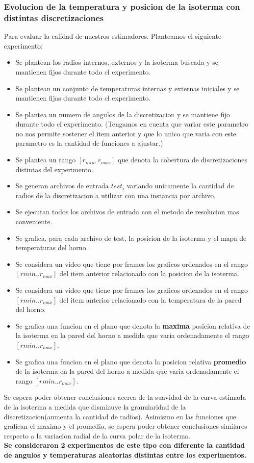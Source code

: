 \subsubsection{Evolucion de la temperatura y posicion de la isoterma con distintas discretizaciones}
Para evaluar la calidad de nuestros estimadores. Planteamos el siguiente experimento:
\begin{itemize}
    \item Se plantean los radios internos, externos y la isoterma buscada y se mantienen fijos durante todo el experimento.
    \item Se plantean un conjunto de temperaturas internas y externas iniciales y se mantienen fijas durante todo el experimento.
    \item Se plantea un numero de angulos de la discretizacion y se mantiene fijo durante todo el experimento. (Tengamos en cuenta que variar este parametro no nos permite sostener el item anterior y que lo unico que varia con este parametro es la cantidad de funciones a ajustar.) 
    \item Se plantea un rango $[r_{min}, r_{max}]$ que denota la cobertura de discretizaciones distintas del experimento.
    \item Se generan archivos de entrada $test_i$ variando unicamente la cantidad de radios de la discretizacion a utilizar con una instancia por archivo.
    \item Se ejecutan todos los archivos de entrada con el metodo de resolucion mas conveniente.
    \item Se grafica, para cada archivo de test, la posicion de la isoterma y el mapa de temperaturas del horno.
    \item Se considera un video que tiene por frames los graficos ordenados en el rango $[r{min}..r_{max}]$ del item anterior relacionado con la posicion de la isoterma.
    \item Se considera un video que tiene por frames los graficos ordenados en el rango $[r{min}..r_{max}]$ del item anterior relacionado con la temperatura de la pared del horno.
    \item Se grafica una funcion en el plano que denota la \textbf{maxima} posicion relativa de la isoterma en la pared del horno a medida que varia ordenadamente el rango $[r{min}..r_{max}]$.
    \item Se grafica una funcion en el plano que denota la posicion relativa \textbf{promedio} de la isoterma en la pared del horno a medida que varia ordenadamente el rango $[r{min}..r_{max}]$.
\end{itemize}

Se espera poder obtener conclusiones acerca de la suavidad de la curva estimada de la isoterma a medida que disminuye la granularidad de la discretizacion(aumenta la cantidad de radios). Asimismo en las funciones que grafican el maximo y el promedio, se espera poder obtener conclusiones similares respecto a la variacion radial de la curva polar de la isoterma.\\
\vspace{0.3cm}
\textbf{Se consideraron 2 experimentos de este tipo con diferente la cantidad de angulos y temperaturas aleatorias distintas entre los experimentos.}

